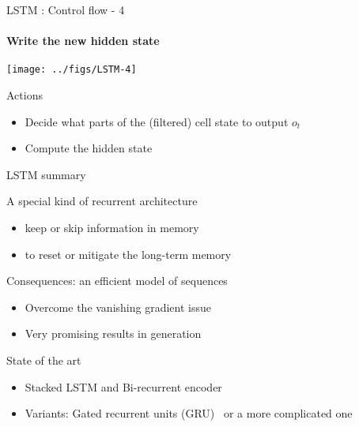 \begin{frame}{LSTM : Control flow - 4}
  \framesubtitle{Write the new hidden state}
  \begin{center}
    \texttt{[image: ../figs/LSTM-4]}
  \end{center}
      \begin{block}{Actions}
        \begin{itemize}
        \item Decide what parts of the (filtered) cell state to output $o_t$ 
        \item Compute the hidden state
        \end{itemize}
      \end{block}
\end{frame}

\begin{frame}{LSTM summary}
  \begin{block}{A special kind of recurrent architecture}
    \begin{itemize}
    \item keep or skip information in  memory
    \item to reset or mitigate the long-term memory
    \end{itemize}
  \end{block}
  \begin{block}{Consequences: an efficient model of sequences}
    \begin{itemize}
    \item Overcome the vanishing gradient issue 
    \item Very promising results in generation
    \end{itemize}
  \end{block}
  \begin{block}{State of the art}
    \begin{itemize}
    \item Stacked LSTM and Bi-recurrent encoder
    \item Variants: Gated recurrent units (GRU)~\cite{Cho14Learning} or a more complicated  one~\cite{Gers00Recurrent}
    \end{itemize}
  \end{block}
  
\end{frame}

